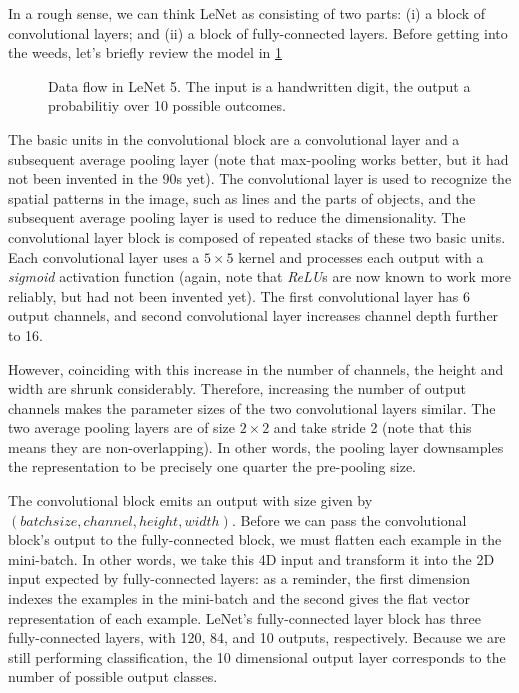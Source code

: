 In a rough sense, we can think LeNet as consisting of two parts: (i) a block of convolutional layers; and (ii) a block of fully-connected layers. Before getting into the weeds, let’s briefly review the model in \cref{fig:lenet}

\begin{figure}[hpt]
	\centering
	
	\caption{Data flow in LeNet 5. The input is a handwritten digit, the output a probabilitiy over 10 possible outcomes.}
	\label{fig:lenet}
\end{figure}

The basic units in the convolutional block are a convolutional layer and a subsequent average pooling layer (note that max-pooling works better, but it had not been invented in the 90s yet). The convolutional layer is used to recognize the spatial patterns in the image, such as lines and the parts of objects, and the subsequent average pooling layer is used to reduce the dimensionality. The convolutional layer block is composed of repeated stacks of these two basic units. Each convolutional layer uses a $5 \times 5$  kernel and processes each output with a \textit{sigmoid} activation function (again, note that \textit{ReLU}s are now known to work more reliably, but had not been invented yet). The first convolutional layer has 6 output channels, and second convolutional layer increases channel depth further to 16.

However, coinciding with this increase in the number of channels, the height and width are shrunk considerably. Therefore, increasing the number of output channels makes the parameter sizes of the two convolutional layers similar. The two average pooling layers are of size  $2 \times 2$  and take stride 2 (note that this means they are non-overlapping). In other words, the pooling layer downsamples the representation to be precisely one quarter the pre-pooling size.

The convolutional block emits an output with size given by $(batch size, channel, height, width)$. Before we can pass the convolutional block’s output to the fully-connected block, we must flatten each example in the mini-batch. In other words, we take this 4D input and transform it into the 2D input expected by fully-connected layers: as a reminder, the first dimension indexes the examples in the mini-batch and the second gives the flat vector representation of each example. LeNet’s fully-connected layer block has three fully-connected layers, with 120, 84, and 10 outputs, respectively. Because we are still performing classification, the 10 dimensional output layer corresponds to the number of possible output classes.

